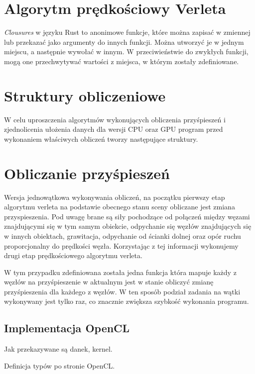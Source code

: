 \documentclass[12pt, letterpaper]{report}
\begin{document}
    \section{Algorytm prędkościowy Verleta}
    

    \emph{Clousures} w języku Rust to anonimowe funkcje, które można zapisać w zmiennej lub przekazać 
    jako argumenty do innych funkcji. Można utworzyć je w jednym miejscu, a następnie wywołać w innym.
    W przeciwieństwie do zwykłych funkcji, mogą one przechwytywać wartości z miejsca, w 
    którym zostały zdefiniowane.

    \section{Struktury obliczeniowe}
    W celu uproszczenia algorytmów wykonujących obliczenia przyśpieszeń i zjednolicenia 
    ułożenia danych dla wersji CPU oraz GPU program przed wykonaniem właściwych obliczeń
    tworzy następujące struktury.

    \section{Obliczanie przyśpieszeń}
    
    Wersja jednowątkowa wykonywania obliczeń, na początku pierwszy etap algorytmu verleta na podstawie 
    obecnego stanu sceny obliczane jest zmiana przyspieszenia. 
    Pod uwagę brane są siły pochodzące od połączeń między 
    węzami znajdującymi się w tym samym obiekcie, odpychanie się węzłów znajdujących się w innych obiektach, 
    grawitacja, odpychanie od ścianki dolnej oraz opór ruchu proporcjonalny do prędkości węzła.
    Korzystając z tej informacji wykonujemy drugi etap prędkościowego algorytmu verleta.

    
    W tym przypadku zdefiniowana została jedna funkcja która mapuje każdy z węzłów na przyśpieszenie
    w aktualnym 
    jest w stanie obliczyć zmianę przyśpieszenia 
    dla każdego z węzłów. W ten sposób podział zadania na wątki wykonywany jest tylko raz, co 
    znacznie zwiększa szybkość wykonania programu.

    \subsection{Implementacja OpenCL}
    Jak przekazywane są danek, kernel.
    
    Definicja typów po stronie OpenCL.
\end{document}
